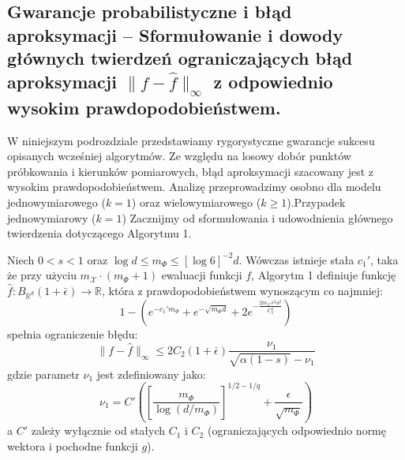 \subsection{Gwarancje probabilistyczne i błąd aproksymacji – Sformułowanie i dowody głównych twierdzeń ograniczających błąd aproksymacji $\|f - \hat{f}\|_\infty$ z odpowiednio wysokim prawdopodobieństwem.}

W niniejszym podrozdziale przedstawiamy rygorystyczne gwarancje sukcesu opisanych wcześniej algorytmów. Ze względu na losowy dobór punktów próbkowania i kierunków pomiarowych, błąd aproksymacji szacowany jest z wysokim prawdopodobieństwem. Analizę przeprowadzimy osobno dla modelu jednowymiarowego ($k=1$) oraz wielowymiarowego ($k \ge 1$).Przypadek jednowymiarowy ($k=1$) Zacznijmy od sformułowania i udowodnienia głównego twierdzenia dotyczącego Algorytmu 1.

\begin{tw}
     Niech $0 < s < 1$ oraz $\log d \le m_\Phi \le [\log 6]^{-2}d$. Wówczas istnieje stała $c_1'$, taka że przy użyciu $m_\mathcal{X} \cdot (m_\Phi + 1)$ ewaluacji funkcji $f$, Algorytm 1 definiuje funkcję $\hat{f}: B_{\mathbb{R}^d}(1+\bar{\epsilon}) \to \mathbb{R}$, która z prawdopodobieństwem wynoszącym co najmniej:
$$1 - \left(e^{-c_1' m_\Phi} + e^{-\sqrt{m_\Phi d}} + 2e^{-\frac{2m_\mathcal{X} s^2 \alpha^2}{C_2^4}}\right)$$spełnia ograniczenie błędu:
$$\|f - \hat{f}\|_\infty \le 2C_2(1+\bar{\epsilon})\frac{\nu_1}{\sqrt{\alpha(1-s)} - \nu_1}$$gdzie parametr $\nu_1$ jest zdefiniowany jako:
$$\nu_1 = C' \left( \left[ \frac{m_\Phi}{\log(d/m_\Phi)} \right]^{1/2 - 1/q} + \frac{\epsilon}{\sqrt{m_\Phi}} \right)$$a $C'$ zależy wyłącznie od stałych $C_1$ i $C_2$ (ograniczających odpowiednio normę wektora i pochodne funkcji $g$).
\end{tw}

